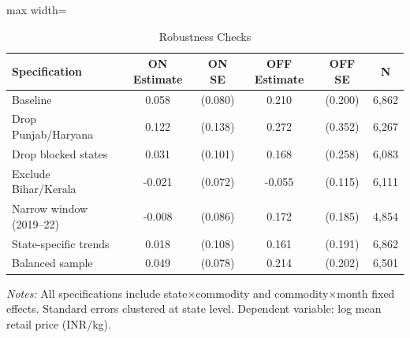 \begin{table}[htbp]
\centering
\caption{Robustness Checks}
\label{tab:robustness}
\begin{adjustbox}{max width=\textwidth}
\begin{tabular}{lccccc}
\toprule
Specification & ON Estimate & ON SE & OFF Estimate & OFF SE & N \\
\midrule
Baseline & 0.058 & (0.080) & 0.210 & (0.200) & 6,862 \\
Drop Punjab/Haryana & 0.122 & (0.138) & 0.272 & (0.352) & 6,267 \\
Drop blocked states & 0.031 & (0.101) & 0.168 & (0.258) & 6,083 \\
Exclude Bihar/Kerala & -0.021 & (0.072) & -0.055 & (0.115) & 6,111 \\
Narrow window (2019--22) & -0.008 & (0.086) & 0.172 & (0.185) & 4,854 \\
State-specific trends & 0.018 & (0.108) & 0.161 & (0.191) & 6,862 \\
Balanced sample & 0.049 & (0.078) & 0.214 & (0.202) & 6,501 \\
\bottomrule
\end{tabular}
\end{adjustbox}
\par\vspace{0.3em}
{\small\textit{Notes:} All specifications include state$\times$commodity and commodity$\times$month fixed effects.
Standard errors clustered at state level.
Dependent variable: log mean retail price (INR/kg).}
\end{table}
